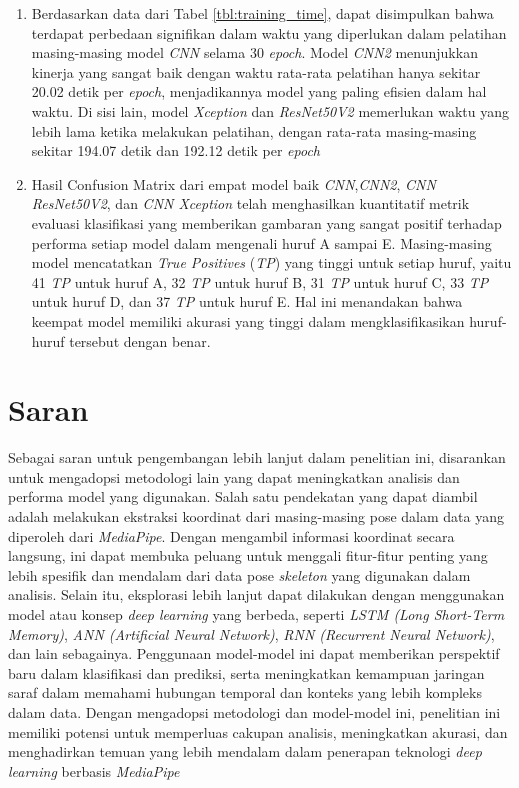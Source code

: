 \begin{enumerate}[nolistsep]
\item Berdasarkan data dari Tabel \ref{tbl:training_time}, dapat disimpulkan bahwa terdapat perbedaan signifikan dalam waktu yang diperlukan dalam pelatihan masing-masing model \textit{CNN} selama 30 \textit{epoch}. Model \textit{CNN2} menunjukkan kinerja yang sangat baik dengan waktu rata-rata pelatihan hanya sekitar 20.02 detik per \textit{epoch}, menjadikannya model yang paling efisien dalam hal waktu. Di sisi lain, model \textit{Xception} dan \textit{ResNet50V2} memerlukan waktu yang lebih lama ketika melakukan pelatihan, dengan rata-rata masing-masing sekitar 194.07 detik dan 192.12 detik per \textit{epoch}
\item Hasil Confusion Matrix dari empat model baik \textit{CNN},\textit{CNN2}, \textit{CNN ResNet50V2}, dan \textit{CNN Xception} telah menghasilkan kuantitatif metrik evaluasi klasifikasi yang memberikan gambaran yang sangat positif terhadap performa setiap model dalam mengenali huruf A sampai E. Masing-masing model mencatatkan \textit{True Positives} (\textit{TP}) yang tinggi untuk setiap huruf, yaitu 41 \textit{TP} untuk huruf A, 32 \textit{TP} untuk huruf B, 31 \textit{TP} untuk huruf C, 33 \textit{TP} untuk huruf D, dan 37 \textit{TP} untuk huruf E. Hal ini menandakan bahwa keempat model memiliki akurasi yang tinggi dalam mengklasifikasikan huruf-huruf tersebut dengan benar.
\end{enumerate}

\section{Saran}
Sebagai saran untuk pengembangan lebih lanjut dalam penelitian ini, disarankan untuk mengadopsi metodologi lain yang dapat meningkatkan analisis dan performa model yang digunakan. Salah satu pendekatan yang dapat diambil adalah melakukan ekstraksi koordinat dari masing-masing pose dalam data yang diperoleh dari \textit{MediaPipe}. Dengan mengambil informasi koordinat secara langsung, ini dapat membuka peluang untuk menggali fitur-fitur penting yang lebih spesifik dan mendalam dari data pose \textit{skeleton} yang digunakan dalam analisis. Selain itu, eksplorasi lebih lanjut dapat dilakukan dengan menggunakan model atau konsep \textit{deep learning} yang berbeda, seperti \textit{LSTM (Long Short-Term Memory)}, \textit{ANN (Artificial Neural Network)},\textit{ RNN (Recurrent Neural Network)}, dan lain sebagainya. Penggunaan model-model ini dapat memberikan perspektif baru dalam klasifikasi dan prediksi, serta meningkatkan kemampuan jaringan saraf dalam memahami hubungan temporal dan konteks yang lebih kompleks dalam data. Dengan mengadopsi metodologi dan model-model ini, penelitian ini memiliki potensi untuk memperluas cakupan analisis, meningkatkan akurasi, dan menghadirkan temuan yang lebih mendalam dalam penerapan teknologi \textit{deep learning} berbasis \textit{MediaPipe}

